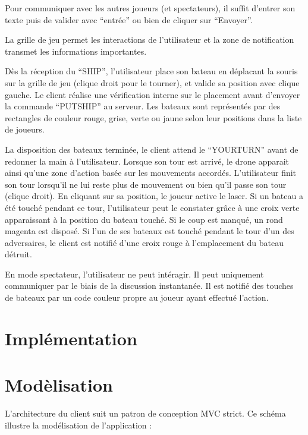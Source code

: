 \documentclass[a4paper, 11pt]{report}
\begin{document}
Pour communiquer avec les autres joueurs (et spectateurs), il suffit d'entrer son texte
puis de valider avec ``entrée'' ou bien de cliquer sur ``Envoyer''.

La grille de jeu permet les interactions de l'utilisateur et la zone de notification transmet les
informations importantes.

Dès la réception du ``SHIP'', l'utilisateur place son bateau en déplacant la souris sur la grille
de jeu (clique droit pour le tourner), et valide sa position avec clique gauche. Le client
réalise une vérification interne sur le placement avant d'envoyer la commande ``PUTSHIP'' au serveur.
Les bateaux sont représentés par des rectangles de couleur rouge, grise, verte ou jaune selon
leur positions dans la liste de joueurs.

La disposition des bateaux terminée, le client attend le ``YOURTURN'' avant de redonner la main
à l'utilisateur. Lorsque son tour est arrivé, le drone apparait ainsi qu'une zone d'action basée
sur les mouvements accordés. L'utilisateur finit son tour lorsqu'il ne lui reste plus de mouvement
ou bien qu'il passe son tour (clique droit). En cliquant sur sa position, le joueur active le laser.
Si un bateau a été touché pendant ce tour, l'utilisateur peut le constater grâce à une
croix verte apparaissant à la position du bateau touché. Si le coup est manqué, un rond magenta
est disposé. Si l'un de ses bateaux est touché pendant le tour d'un des adversaires, le client est
notifié d'une croix rouge à l'emplacement du bateau détruit.

En mode spectateur, l'utilisateur ne peut intéragir. Il peut uniquement communiquer par le biais
de la discussion instantanée. Il est notifié des touches de bateaux par un code couleur
propre au joueur ayant effectué l'action.

\section{Implémentation}

\section{Modèlisation}
L'architecture du client suit un patron de conception MVC strict.
Ce schéma illustre la modélisation de l'application :

\end{document}
